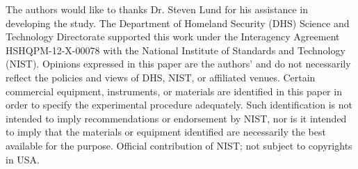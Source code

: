 \documentclass[fleqn,10pt,lineno]{wlpeerj}\usepackage[]{graphicx}\usepackage[]{color}
\begin{document}
The authors would like to thanks Dr. Steven Lund for his assistance in developing the study.
The Department of Homeland Security (DHS) Science and Technology Directorate supported this work under the Interagency Agreement HSHQPM-12-X-00078 with the National Institute of Standards and Technology (NIST).
Opinions expressed in this paper are the authors’ and do not necessarily reflect the policies and views of DHS,  NIST, or affiliated venues.
Certain commercial equipment, instruments, or materials are identified in this paper in order to specify the experimental procedure adequately.
Such identification is not intended to imply recommendations or endorsement by NIST,
nor is it intended to imply that the materials or equipment identified are necessarily the best available for the purpose.
Official contribution of NIST; not subject to copyrights in USA.


\end{document}
